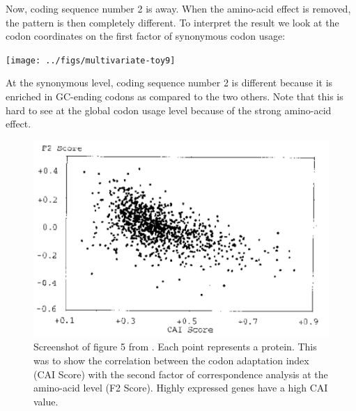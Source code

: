\documentclass{article}
\begin{document}
Now, coding sequence number 2 is away. When the amino-acid effect is removed, the pattern is then
completely different. To interpret the result we look at the codon coordinates on the first factor of
synonymous codon usage:

\begin{Schunk}
\end{Schunk}
\texttt{[image: ../figs/multivariate-toy9]}

At the synonymous level, coding sequence number 2 is different because it is enriched in GC-ending codons
as compared to the two others. Note that this is hard to see at the global codon usage level because of the
strong amino-acid effect.

\begin{figure}[htbp]
   \begin{center}
      \includegraphics{../figs/lobgau5}
   \end{center}
   \caption{Screenshot of figure 5 from \cite{lobrygautier}. Each point represents
   a protein. This was to show the correlation between the codon adaptation index (CAI Score)
   with the second factor of correspondence analysis at the amino-acid level (F2 Score). Highly
   expressed genes have a high CAI value.
   }
   \label{lobgau5}
\end{figure}
\end{document}
